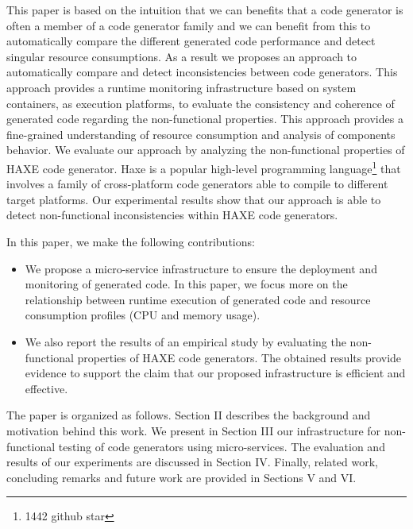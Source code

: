 This paper is based on the intuition that we can benefits that a code generator is often a member of a code generator family and we can benefit from this to automatically compare the different generated code performance and detect singular resource consumptions. As a result we proposes an approach to automatically compare and detect inconsistencies between code generators. This approach provides a runtime monitoring infrastructure based on system containers, as execution platforms, to evaluate the consistency and coherence of generated code regarding the non-functional properties. This approach provides a fine-grained understanding of resource consumption and analysis of components behavior. 
We evaluate our approach by analyzing the non-functional properties of HAXE code generator. Haxe is a popular high-level programming language\footnote{1442 github star} that involves a family of cross-platform code generators able to compile to different target platforms. Our experimental results show that our approach is able to detect non-functional inconsistencies within HAXE code generators.


In this paper, we make the following contributions:
\begin{itemize} 	
	
	\item We propose a micro-service infrastructure to ensure the deployment and monitoring of generated code. In this paper, we focus more on the relationship between runtime execution of generated code and resource consumption profiles (CPU and memory usage).
	\item We also report the results of an empirical study by evaluating the non-functional properties of HAXE code generators. The obtained results provide evidence to support the claim that our proposed infrastructure is efficient and effective.	
\end{itemize}

The paper is organized as follows.
Section II describes the background and motivation behind this work. We present in Section III our infrastructure for non-functional testing of code generators using micro-services. 
The evaluation and results of our experiments are discussed in Section IV. 
Finally, related work, concluding remarks and future work are provided in Sections V and VI.





